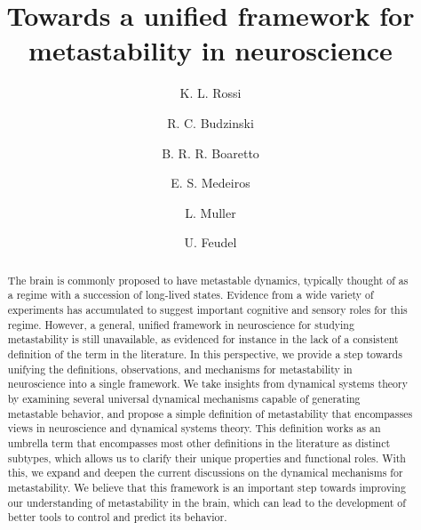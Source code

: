 \documentclass[reprint,onecolumn,superscriptaddress,showpacs,amsmath,amssymb,aps,floatfix]{revtex4-2}
\theoremstyle{definition}
\begin{document}
\title{Towards a unified framework for metastability in neuroscience}
\author{K. L. Rossi}
\author{R. C. Budzinski}
\author{B. R. R. Boaretto}
\author{E. S. Medeiros}
\author{L. Muller}
\author{U. Feudel}


\begin{abstract}
The brain is commonly proposed to have metastable dynamics, typically thought of as a regime with a succession of long-lived states. Evidence from a wide variety of experiments has accumulated to suggest important cognitive and sensory roles for this regime. However, a general, unified framework in neuroscience for studying metastability is still unavailable, as evidenced for instance in the lack of a consistent definition of the term in the literature. In this perspective, we provide a step towards unifying the definitions, observations, and mechanisms for metastability in neuroscience into a single framework. We take insights from dynamical systems theory by examining several universal dynamical mechanisms capable of generating metastable behavior, and propose a simple definition of metastability that encompasses views in neuroscience and dynamical systems theory. This definition works as an umbrella term that encompasses most other definitions in the literature as distinct subtypes, which allows us to clarify their unique properties and functional roles. With this, we expand and deepen the current discussions on the dynamical mechanisms for metastability. We believe that this framework is an important step towards improving our understanding of metastability in the brain, which can lead to the development of better tools to control and predict its behavior. 
\end{abstract}
\end{document}
